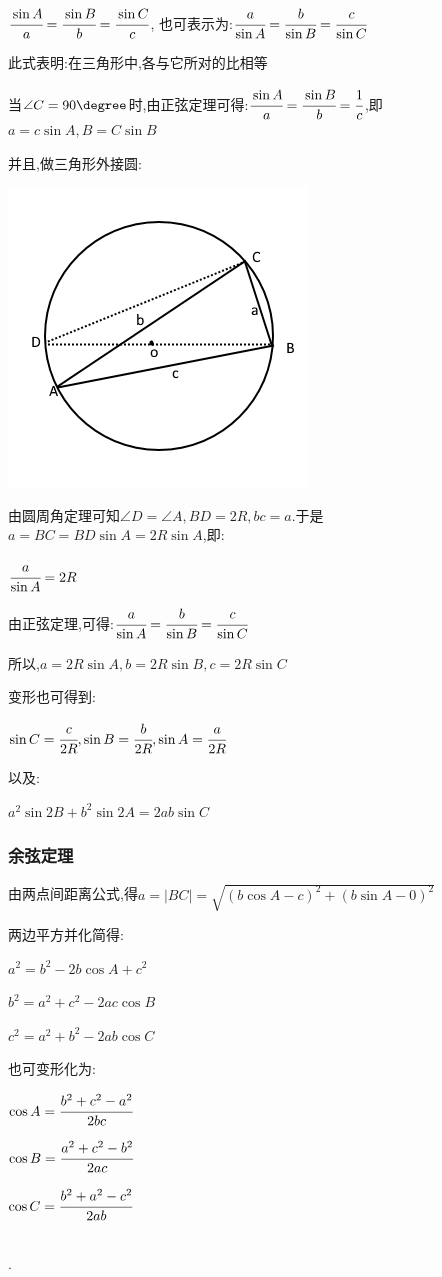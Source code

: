 {{$\cfrac{\sin A}{a} = \cfrac{\sin B}{b} = \cfrac{\sin C}{c}$, 也可表示为:$\cfrac{a}{\sin A} = \cfrac{b}{\sin B} = \cfrac{c}{\sin C}$

此式表明:在三角形中,各{}与它所对{}的比相等

当$\angle C = 90\degree$时,由正弦定理可得:$\cfrac{\sin A}{a} = \cfrac{\sin B}{b} = \cfrac{1}{c}$,即$a = c\sin A,B = C\sin B$

并且,做三角形外接圆:

\begin{center}
  \includegraphics[scale=0.5]{resources/insideTriangleAndCircleOutSide.png}
\end{center}

由圆周角定理可知$\angle D = \angle A,BD = 2R,bc = a$.于是$a = BC = BD\sin A = 2R\sin A$,即:

$\cfrac{a}{\sin A} = 2R$

由正弦定理,可得:$\cfrac{a}{\sin A} = \cfrac{b}{\sin B} = \cfrac{c}{\sin C}$

所以,$a = 2R\sin A,b = 2R\sin B,c = 2R\sin C$

变形也可得到:

$\sin C = \cfrac{c}{2R},\sin B = \cfrac{b}{2R},\sin A = \cfrac{a}{2R}$

以及:

$a^2\sin2B + b^2\sin2A = 2ab\sin C$
}%

\subsubsection{余弦定理}{
  由两点间距离公式,得$a = |BC| = \sqrt{(b\cos A - c)^2 + (b\sin A - 0)^2}$

  两边平方并化简得:

  $a^2 = b^2 - 2b\cos A + c^2$

  $b^2 = a^2 + c^2 - 2ac\cos B$

  $c^2 = a^2 + b^2 - 2ab\cos C$

  也可变形化为:

  $\cos A = \cfrac{b^2 + c^2 - a^2}{2bc}$

  $\cos B = \cfrac{a^2 + c^2 - b^2}{2ac}$

  $\cos C = \cfrac{b^2 + a^2 - c^2}{2ab}$
}%
\\

.

}%